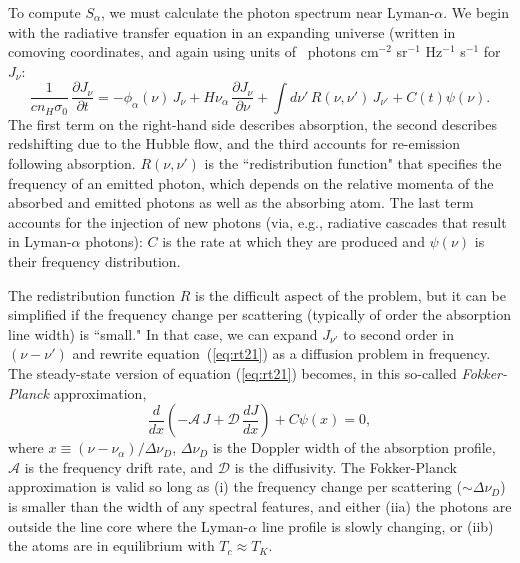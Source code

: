 To compute $S_\alpha$, we must calculate the photon spectrum near Lyman-$\alpha$.  We begin with the radiative
transfer equation in an expanding universe (written in comoving coordinates, and again using units of ~photons cm$^{-2}$ sr$^{-1}$ Hz$^{-1}$ s$^{-1}$ for $J_\nu$:
\begin{equation}
\frac{1}{c n_H \sigma_0} \, \frac{\partial J_\nu}{\partial t} = -\phi_\alpha(\nu) \, J_\nu + H \nu_\alpha \, \frac{\partial J_\nu}{\partial \nu} + \int d \nu' \, R(\nu,\nu') \, J_{\nu'} + C(t) \psi(\nu).
\label{eq:rt21}
\end{equation}
The first term on the right-hand side describes absorption, the second describes redshifting due to the Hubble flow, and the third accounts for re-emission following absorption.  $R(\nu,\nu')$ is the ``redistribution function" that specifies the frequency of an emitted photon, which depends on the relative momenta of the absorbed and
emitted photons as well as the absorbing atom. The last term accounts for the injection of new photons (via, e.g., radiative cascades that result in Lyman-$\alpha$ photons): $C$ is the rate at which they are produced and $\psi(\nu)$ is their frequency distribution.

The redistribution function $R$ is the difficult aspect of the problem, but it can be simplified if the frequency change per scattering (typically of order the absorption line width) is ``small."  In that case, we can expand $J_{\nu'}$ to second order in $(\nu-\nu')$ and rewrite equation~(\ref{eq:rt21}) as a diffusion problem in frequency.
The steady-state version of equation (\ref{eq:rt21}) becomes, in this so-called {\it Fokker-Planck} approximation, \cite{chen04}
\begin{equation}
\frac{d}{d x} \left( - {\mathcal A} \, J + {\mathcal D} \, \frac{d J}{d x} \right) + C \psi(x) = 0,
\label{eq:fokker}
\end{equation}
where $x \equiv (\nu-\nu_\alpha)/\Delta \nu_D$, $\Delta \nu_D$ is the Doppler width of the absorption profile, ${\mathcal A}$ is the frequency drift rate, and ${\mathcal D}$ is the diffusivity.  The Fokker-Planck approximation is valid so long as (i) the frequency change per scattering ($\sim \Delta \nu_D$) is smaller than the width of any spectral features, and either (iia) the photons are outside the line core where the Lyman-$\alpha$ line profile is slowly changing, or (iib) the atoms are in equilibrium with $T_c \approx T_K$.

